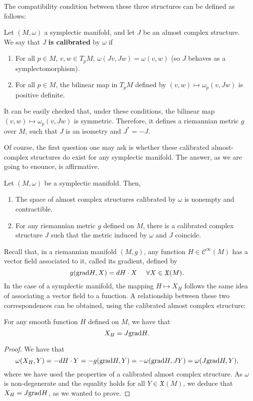 The compatibility condition between these three structures can be defined as follows:

\begin{deff} \label{definition:calibrated_almost_complex}
Let $(M,\omega)$ a symplectic manifold, and let $J$ be an almost complex structure. We say that $J$ {\bf is calibrated} by $\omega$ if

\begin{enumerate}
	\item For all $p \in M$, $v,w \in T_pM$, $\omega(Jv,Jw) = \omega(v,w)$ (so $J$ behaves as a symplectomorphism).
	\item For all $p \in M$, the bilinear map in $T_pM$ defined by $(v,w) \mapsto \omega_p(v,Jw)$ is positive definite.
\end{enumerate}
\end{deff}

It can be easily checked that, under these conditions, the bilinear map $(v,w) \mapsto \omega_p(v,Jw)$ is symmetric. Therefore, it defines a riemannian metric $g$ over $M$, such that $J$ is an isometry and $J^{\ast} = - J$.

Of course, the first question one may ask is whether these calibrated almost-complex structures do exist for any symplectic manifold. The answer, as we are going to enounce, is affirmative.

\begin{prop} Let $(M,\omega)$ be a symplectic manifold. Then,

\begin{enumerate}
	\item The space of almost complex structures calibrated by $\omega$ is nonempty and contractible.
	\item For any riemannian metric $g$ defined on $M$, there is a calibrated complex structure $J$ such that the metric induced by $\omega$ and $J$ coincide.
\end{enumerate}
\end{prop}

Recall that, in a riemannian manifold $(M,g)$, any function $H \in \mathcal{C}^{\infty}(M)$ has a vector field associated to it, called its gradient, defined by
\[g(\mathrm{grad} H, X) = d H \cdot X \ \ \ \ \forall X \in \mathfrak{X}(M) .\]
In the case of a symplectic manifold, the mapping $H \mapsto X_H$ follows the same idea of associating a vector field to a function. A relationship between these two correspondences can be obtained, using the calibrated almost complex structure:

\begin{prop} \label{prop:symplectic_gradient}
For any smooth function $H$ defined on $M$, we have that
\[X_H = J \mathrm{grad} H .\]
\end{prop}

\begin{proof}
We have that
\[\omega(X_H,Y) = - d H \cdot Y = - g(\mathrm{grad} H,Y) = - \omega(\mathrm{grad} H,JY) = \omega(J \mathrm{grad} H, Y) ,\]
where we have used the properties of a calibrated almost complex structure. As $\omega$ is non-degenerate and the equality holds for all $Y \in \mathfrak{X}(M)$, we deduce that $X_H = J \mathrm{grad} H$, as we wanted to prove.
\end{proof}
